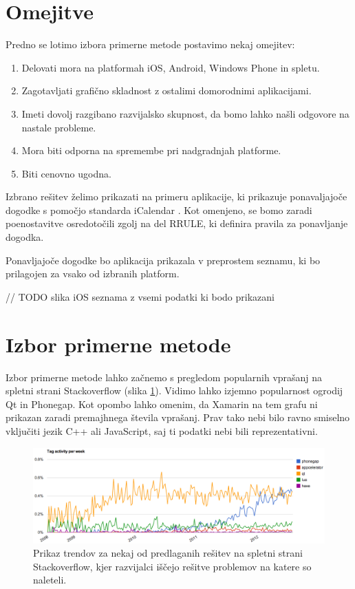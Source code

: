 \section{Omejitve}

Predno se lotimo izbora primerne metode postavimo nekaj omejitev:

\begin{enumerate}
  \item Delovati mora na platformah iOS, Android, Windows Phone in spletu.
  \item Zagotavljati grafično skladnost z ostalimi domorodnimi aplikacijami.
  \item Imeti dovolj razgibano razvijalsko skupnost, da bomo lahko našli odgovore na nastale probleme.
  \item Mora biti odporna na spremembe pri nadgradnjah platforme.
  \item Biti cenovno ugodna.
\end{enumerate}

Izbrano rešitev želimo prikazati na primeru aplikacije, ki prikazuje ponavaljajoče dogodke s pomočjo standarda iCalendar \cite{rfc5545}. Kot omenjeno, se bomo zaradi poenostavitve osredotočili zgolj na del RRULE, ki definira pravila za ponavljanje dogodka.

Ponavljajoče dogodke bo aplikacija prikazala v preprostem seznamu, ki bo prilagojen za vsako od izbranih platform.

// TODO slika iOS seznama z vsemi podatki ki bodo prikazani

\section{Izbor primerne metode}

Izbor primerne metode lahko začnemo s pregledom popularnih vprašanj na spletni strani Stackoverflow (slika \ref{fig:stackoverflow-trends}). Vidimo lahko izjemno popularnost ogrodij Qt in Phonegap. Kot opombo lahko omenim, da Xamarin na tem grafu ni prikazan zaradi premajhnega števila vprašanj. Prav tako nebi bilo ravno smiselno vključiti jezik C++ ali JavaScript, saj ti podatki nebi bili reprezentativni.

\begin{figure}
 \includegraphics[width=\linewidth]{stackoverflow-trends}
 \caption{Prikaz trendov za nekaj od predlaganih rešitev na spletni strani Stackoverflow, kjer razvijalci iščejo rešitve problemov na katere so naleteli.}
 \label{fig:stackoverflow-trends}
\end{figure}


